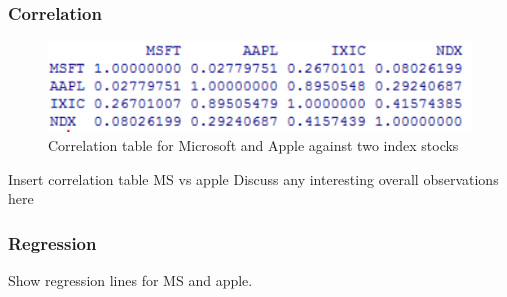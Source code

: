 \documentclass[paper=a4, fontsize=11pt]{scrartcl} %
\numberwithin{equation}{section} %
\numberwithin{figure}{section} %
\numberwithin{table}{section} %
\begin{document}
\subsubsection{Correlation}

\begin{figure}[!htb]
  \includegraphics[width=\linewidth]{graph/cor9.png}
  \caption{Correlation table for Microsoft and Apple against two index stocks}
\endminipage\hfill
\end{figure}

Insert correlation table MS vs apple
Discuss any interesting overall observations here

\subsubsection{Regression}
Show regression lines for MS and apple. 
\end{document}
